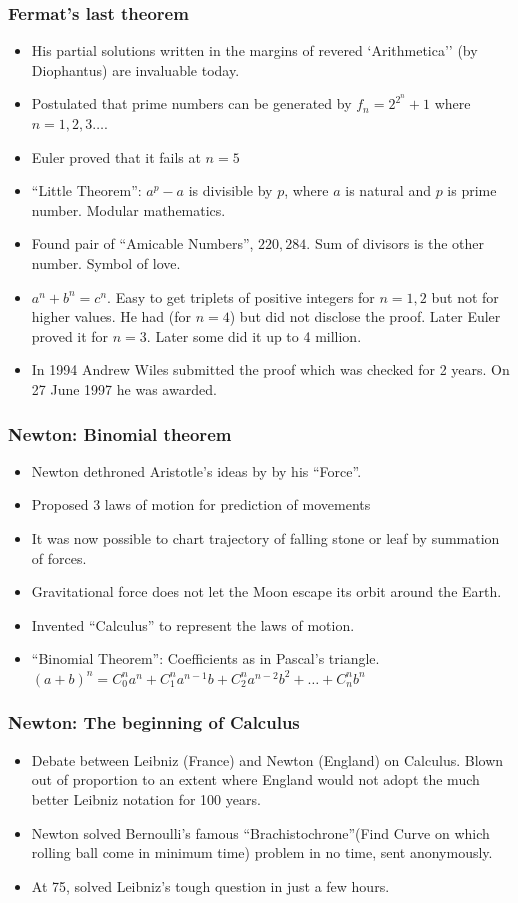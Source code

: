 \begin{frame}[fragile]
\frametitle{Fermat's last theorem}
\begin{itemize}
\item His partial solutions written in the margins of  revered `Arithmetica'' (by Diophantus) are invaluable today.
\item Postulated that prime numbers can be generated by $f_n = 2^{2^n} +1$ where $n = 1,2,3 \ldots$. 
\item Euler proved that it fails at $n=5$
\item ``Little Theorem'': $a^p -a$ is divisible by $p$, where $a$ is natural and $p$ is prime number. Modular mathematics.
\item Found pair of ``Amicable Numbers'', $220,284$. Sum of divisors is the other number. Symbol of love.
\item $a^n + b^n = c^n$. Easy to get triplets of positive integers for $n=1,2$ but not for higher values. He had (for $n=4$) but did not disclose the proof. Later Euler proved it for $n=3$. Later some did it up to 4 million.
\item In 1994 Andrew Wiles submitted the proof which was checked for 2 years. On 27 June 1997 he was awarded.
\end{itemize}
\end{frame}

\begin{frame}[fragile]
\frametitle{Newton: Binomial theorem}
\begin{itemize}
\item Newton dethroned Aristotle's ideas by by his ``Force''.
\item Proposed 3 laws of motion for prediction of movements
\item It was now possible to chart trajectory of falling stone or leaf by summation of forces.
\item Gravitational force does not let the Moon escape its orbit around the Earth.
\item Invented ``Calculus'' to represent the laws of motion.
\item ``Binomial Theorem'': Coefficients as in Pascal's triangle. $(a+b)^n = C^n_0 a^n + C^n_1 a^{n-1}b + C^n_2 a^{n-2} b^2 + \ldots + C^n_nb^n$
\end{itemize}
\end{frame}

\begin{frame}[fragile]
\frametitle{Newton: The beginning of Calculus}
\begin{itemize}
\item Debate between Leibniz (France) and Newton (England) on Calculus. Blown out of proportion to an extent where England would not adopt the much better Leibniz notation for 100 years.
\item Newton solved Bernoulli's famous ``Brachistochrone''(Find Curve on which rolling ball come in minimum time) problem in no time, sent anonymously.
\item At 75, solved Leibniz's tough question in just a few hours.
\end{itemize}
\end{frame}


